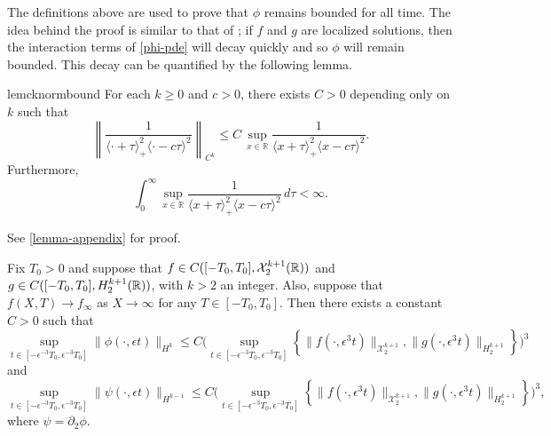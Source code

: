 The definitions above are used to prove that \(\phi\) remains bounded for all time. The idea behind the proof is similar to that of \cite[Lemma~3.1]{schneider2000counter}; if \(f\) and \(g\) are localized solutions, then the interaction terms of \cref{phi-pde} will decay quickly and so \(\phi\) will remain bounded. This decay can be quantified by the following lemma.
\begin{restatable}{lem}{cknormbound}
	For each \(k\geq 0\) and \(c > 0\), there exists \(C> 0\) depending only on \(k\) such that 
	\begin{equation}\label{Ck-bound}
		\left \| \frac 1 {\langle \cdot +\tau\rangle_+^2 \langle \cdot - c\tau \rangle^2} \right \|_{C^k} \leq C\, \sup_{x\in\mathbb R} \frac 1 {\langle x +\tau\rangle_+^2 \langle x -c \tau \rangle^2}.
	\end{equation}
	Furthermore,
	\begin{equation}\label{sup-integrable}
		\int_0^\infty \sup_{x\in\mathbb R} \frac 1 {\langle x +\tau\rangle_+^2 \langle x -c \tau \rangle^2}\, d\tau <\infty.
	\end{equation}
\end{restatable}
See \cref{lemma-appendix} for proof. 

\begin{prop}
	Fix \(T_0> 0\) and suppose that \(f \in C([-T_0,T_0], \mathcal{X}_2^{k+1}(\mathbb{R}))\) and \(g \in C([-T_0,T_0], H^{k+1}_2(\mathbb{R})) \), with \(k>2\) an integer. Also, suppose that \(f(X,T)\to f_\infty\) as \(X\to \infty\) for any \(T\in[-T_0,T_0]\). Then there exists a constant \(C>0\) such that 
	\begin{equation}\label{phi-bound}
		\sup_{t\in[-\epsilon^{-3}T_0,\epsilon^{-3}T_0]} \|\phi(\cdot,\epsilon t)\|_{H^k} \leq C \Bigg( \sup_{t\in[-\epsilon^{-3}T_0,\epsilon^{-3}T_0]} \left\{\| f(\cdot, \epsilon^3t) \|_{\mathcal X^{k+1}_{2}},  \| g(\cdot, \epsilon^3t) \|_{H^{k+1}_2} \right\}\Bigg)^3
	\end{equation}
	and
	\begin{equation}\label{psi-bound}
		\sup_{t\in[-\epsilon^{-3}T_0,\epsilon^{-3}T_0]} \|\psi(\cdot,\epsilon t)\|_{H^{k-1}} \leq C \Bigg( \sup_{t\in[-\epsilon^{-3}T_0,\epsilon^{-3}T_0]} \left\{\| f(\cdot, \epsilon^3t) \|_{\mathcal X^{k+1}_{2}},  \| g(\cdot, \epsilon^3t) \|_{H^{k+1}_2} \right\}\Bigg)^3,
	\end{equation}
	where \(\psi = \partial_2 \phi\).
\end{prop}

